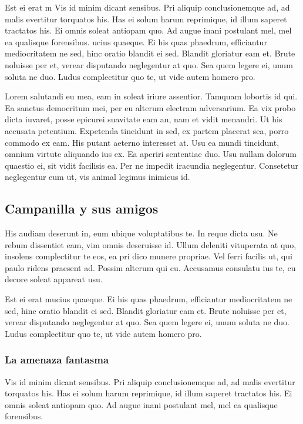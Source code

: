 \documentclass[a4paper, 11pt, titlepage, twocolumn]{book}
\begin{document}
Est ei erat m
Vis id minim dicant sensibus. Pri aliquip conclusionemque ad, ad malis evertitur torquatos his. Has ei solum harum reprimique, id illum saperet tractatos his. Ei omnis soleat antiopam quo. Ad augue inani postulant mel, mel ea qualisque forensibus.
ucius quaeque. Ei his quas phaedrum, efficiantur mediocritatem ne sed, hinc oratio blandit ei sed. Blandit gloriatur eam et. Brute noluisse per et, verear disputando neglegentur at quo. Sea quem legere ei, unum soluta ne duo. Ludus complectitur quo te, ut vide autem homero pro.

Lorem salutandi eu mea, eam in soleat iriure assentior. Tamquam lobortis id qui. Ea sanctus democritum mei, per eu alterum electram adversarium. Ea vix probo dicta iuvaret, posse epicurei suavitate eam an, nam et vidit menandri. Ut his accusata petentium.
Expetenda tincidunt in sed, ex partem placerat sea, porro commodo ex eam. His putant aeterno interesset at. Usu ea mundi tincidunt, omnium virtute aliquando ius ex. Ea aperiri sententiae duo. Usu nullam dolorum quaestio ei, sit vidit facilisis ea. Per ne impedit iracundia neglegentur. Consetetur neglegentur eum ut, vis animal legimus inimicus id.

\subsection{Campanilla y sus amigos}

His audiam deserunt in, eum ubique voluptatibus te. In reque dicta usu. Ne rebum dissentiet eam, vim omnis deseruisse id. Ullum deleniti vituperata at quo, insolens complectitur te eos, ea pri dico munere propriae. Vel ferri facilis ut, qui paulo ridens praesent ad. Possim alterum qui cu. Accusamus consulatu ius te, cu decore soleat appareat usu.

Est ei erat mucius quaeque. Ei his quas phaedrum, efficiantur mediocritatem ne sed, hinc oratio blandit ei sed. Blandit gloriatur eam et. Brute noluisse per et, verear disputando neglegentur at quo. Sea quem legere ei, unum soluta ne duo. Ludus complectitur quo te, ut vide autem homero pro.

\subsubsection{La amenaza fantasma}

Vis id minim dicant sensibus. Pri aliquip conclusionemque ad, ad malis evertitur torquatos his. Has ei solum harum reprimique, id illum saperet tractatos his. Ei omnis soleat antiopam quo. Ad augue inani postulant mel, mel ea qualisque forensibus.
\end{document}
